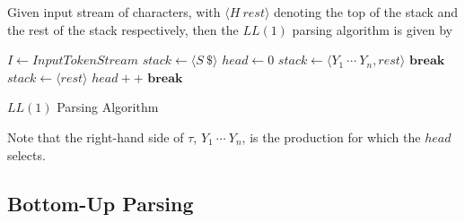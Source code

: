 \begin{definition}
    Given input stream of characters, with $\langle H\ rest \rangle$ denoting the top of the stack and the rest of the stack respectively, then the $LL(1)$ parsing algorithm is given by
    \begin{algorithm}[H]
        \begin{algorithmic}[1]
                \State $I \gets InputTokenStream$
                \State $stack \gets \langle S\ \$ \rangle$
                \State $head \gets 0$
                \Repeat
                                \State $stack \gets \langle Y_1\ \cdots\ Y_n, rest \rangle$
                            \Else
                                \State {}
                            \EndIf
                            \State $\textbf{break}$
                        \EndCase
                                \State $stack \gets \langle rest \rangle$
                                \State $head{+}{+}$
                            \Else
                                \State {}
                            \EndIf
                            \State $\textbf{break}$
                        \EndCase
                    \EndSwitch
            \EndProcedure
        \end{algorithmic}
        \caption{$LL(1)$ Parsing Algorithm}
        \label{prog:ll1-parsing-algorithm}
    \end{algorithm}
    
    Note that the right-hand side of $\tau$, $Y_1\ \cdots\ Y_n$, is the production for which the $head$ selects.
\end{definition}

\subsection{Bottom-Up Parsing}

